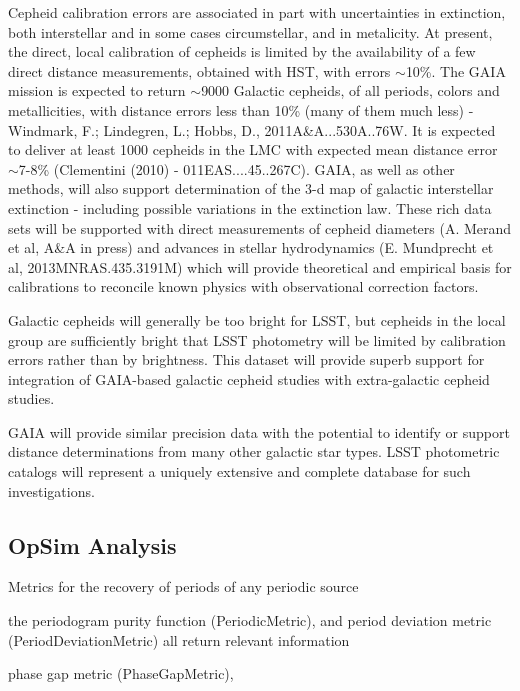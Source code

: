 Cepheid calibration errors are associated in part with uncertainties in extinction, both interstellar and in some cases circumstellar, and in metalicity.  At present, the direct, local calibration of cepheids is limited by the availability of a few direct distance measurements, obtained with HST, with errors $\sim$10\%.  The GAIA mission is expected to return $\sim$9000 Galactic cepheids, of all periods, colors and metallicities, with distance errors less than 10\% (many of them much less) - Windmark, F.; Lindegren, L.; Hobbs, D., 2011A&A...530A..76W. It is expected to deliver at least 1000 cepheids in the LMC with expected mean distance error $\sim$7-8\% (Clementini (2010) - 011EAS....45..267C).  GAIA, as well as other methods, will also support determination of the 3-d map of galactic interstellar extinction - including possible variations in the extinction law. These rich data sets will be supported with direct measurements of cepheid diameters (A. Merand et al, A\&A in press) and advances in stellar hydrodynamics (E. Mundprecht et al, 2013MNRAS.435.3191M) which will provide theoretical and empirical basis for calibrations to reconcile known physics with observational correction factors.

Galactic cepheids will generally be too bright for LSST, but cepheids in the local group are sufficiently bright that LSST photometry will be limited by calibration errors rather than by brightness.  This dataset will provide superb support for integration of GAIA-based galactic cepheid studies with extra-galactic cepheid studies.

GAIA will provide similar precision data with the potential to identify or support distance determinations from many other galactic star types.  LSST photometric catalogs will represent a uniquely extensive and complete database for such investigations.


\subsection{OpSim Analysis}
\label{sec:keyword:analysis}


Metrics for the recovery of periods of any periodic source 

 the periodogram purity function (PeriodicMetric),  and period deviation metric (PeriodDeviationMetric) all return relevant information 

phase gap metric (PhaseGapMetric),

